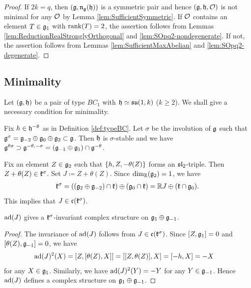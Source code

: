 \begin{proof}
	If $2k = q$, then $(\mathfrak{g}, \mathfrak{n}_{\mathfrak{g}}(\mathfrak{h}))$ is a symmetric pair and hence $(\mathfrak{g}, \mathfrak{h}, \mathcal{O})$ is not minimal for any $\mathcal{O}$ by Lemma \ref{lem:SufficientSymmetric}.
	If $\mathcal{O}$ contains an element $T \in \mathfrak{g}_1$ with $\operatorname{rank}(T) = 2$, the assertion follows from Lemmas \ref{lem:ReductionRealStronglyOrthogonal} and \ref{lem:SOpq2-nondegenerate}.
	If not, the assertion follows from Lemmas \ref{lem:SufficientMaxAbelian} and \ref{lem:SOpq2-degenerate}.
\end{proof}


\subsection{Minimality} \label{subsect:AssociatedPair}

Let $(\mathfrak{g}, \mathfrak{h})$ be a pair of type $BC_1$ with $\mathfrak{h} \simeq \mathfrak{su}(1, k)$ ($k \geq 2$).
We shall give a necessary condition for minimality.

Fix $h \in \mathfrak{h}^{-\theta}$ as in Definition \ref{def:typeBC}.
Let $\sigma$ be the involution of $\mathfrak{g}$ such that $\mathfrak{g}^\sigma = \mathfrak{g}_{-2}\oplus\mathfrak{g}_0 \oplus \mathfrak{g}_2 \subset \mathfrak{g}$.
Then $\mathfrak{h}$ is $\sigma$-stable and we have $\mathfrak{g}^{\theta\sigma} \supset \mathfrak{g}^{-\theta, -\sigma} = (\mathfrak{g}_{-1}\oplus \mathfrak{g}_1) \cap \mathfrak{g}^{-\theta}$.

Fix an element $Z \in \mathfrak{g}_2$ such that $\left\{h, Z, -\theta(Z) \right\}$ forms an $\mathfrak{sl}_2$-triple.
Then $Z + \theta(Z) \in \mathfrak{k}^\sigma$.
Set $J\coloneq Z + \theta(Z)$.
Since $\dim_{\mathbb{R}}(\mathfrak{g}_2) = 1$, we have
\begin{align}
	\mathfrak{k}^\sigma = ((\mathfrak{g}_2 \oplus \mathfrak{g}_{-2}) \cap \mathfrak{k}) \oplus (\mathfrak{g}_0\cap \mathfrak{k}) = \mathbb{R} J \oplus (\mathfrak{k}\cap \mathfrak{g}_0). \label{eqn:KsigmaDecomp}
\end{align}
This implies that $J \in \mathfrak{c}(\mathfrak{k}^\sigma)$.

\begin{lemma}\label{lem:ComplexStructure}
	$\mathrm{ad}(J)$ gives a $\mathfrak{k}^{\sigma}$-invariant complex structure on $\mathfrak{g}_1\oplus \mathfrak{g}_{-1}$.
\end{lemma}

\begin{proof}
	The invariance of $\mathrm{ad}(J)$ follows from $J \in \mathfrak{c}(\mathfrak{k}^\sigma)$.
	Since $[Z, \mathfrak{g}_1] = 0$ and $[\theta(Z), \mathfrak{g}_{-1}] = 0$, we have
	\begin{align*}
		\mathrm{ad}(J)^2(X) &= [Z, [\theta(Z), X]] = [[Z, \theta(Z)], X] = [-h, X] = -X
	\end{align*}
	for any $X \in \mathfrak{g}_1$.
	Similarly, we have $\mathrm{ad}(J)^2(Y) = -Y$ for any $Y \in \mathfrak{g}_{-1}$.
	Hence $\mathrm{ad}(J)$ defines a complex structure on $\mathfrak{g}_1 \oplus \mathfrak{g}_{-1}$.
\end{proof}

